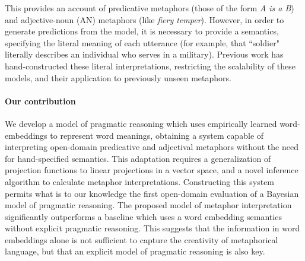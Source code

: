 \documentclass[9pt,twocolumn,twoside,lineno]{pnas-new}
\begin{document}
	


	
% 

	This provides an account of predicative metaphors (those of the form \emph{A is a B}) and adjective-noun (AN) metaphors (like \emph{fiery temper}). However, in order to generate predictions from the model, it is necessary to provide a semantics, specifying the literal meaning of each utterance (for example, that ``soldier" literally describes an individual who serves in a military). Previous work has hand-constructed these literal interpretations, restricting the scalability of these models, and their application to previously unseen metaphors.

	\paragraph{Our contribution} 


	We develop a model of pragmatic reasoning which uses empirically learned word-embeddings \cite{mikolov2013distributed,pennington2014glove} to represent word meanings, obtaining a system capable of interpreting open-domain predicative and adjectival metaphors without the need for hand-specified semantics. 
	This adaptation requires a generalization of projection functions to linear projections in a vector space, and a novel inference algorithm to calculate metaphor interpretations.
	Constructing this system permits what is to our knowledge the first open-domain evaluation of a Bayesian model of pragmatic reasoning.
	The proposed model of metaphor interpretation significantly outperforms a baseline which uses a word embedding semantics without explicit pragmatic reasoning. This suggests that the information in word embeddings alone is not sufficient to capture the creativity of metaphorical language, but that an explicit model of pragmatic reasoning is also key.
\end{document}
